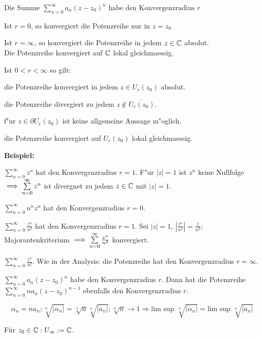 \documentclass[a4paper,twoside,DIV15,BCOR12mm]{scrbook}
\begin{document}
\begin{satz}
Die Summe $  \sum\limits_{n=0}^\infty a_n(z-z_0)^n \text{ habe den Konvergenzradius } r$\\
\begin{liste}
 \item Ist $r=0$, so konvergiert die Potenzreihe nur in $z=z_0$
 \item Ist $r=\infty$, so konvergiert die Potenzreihe in jedem $z\in\mathbb{C}$ absolut. \\
  Die Potenzreihe konvergiert auf $\mathbb{C}$ lokal gleichmaessig.
 \item Ist $0<r<\infty$ so gilt: 
  \begin{liste}
   \item die Potenzreihe konvergiert in jedem $z\in U_r(z_0)$ absolut.
   \item die Potenzreihe divergiert zu jedem $z \not\in \overline{U_r(z_0)}$.
   \item f"ur $z\in \partial U_r(z_0)$ ist keine allgemeine Aussage m"oglich.
   \item die Potenzreihe konvergiert auf $U_r(z_0)$ lokal gleichmaessig.
  \end{liste}
\end{liste}
\end{satz}
\textbf{Beispiel:}\\
 \begin{liste}
  \item $ \sum\limits_{n=0}^\infty z^n $ hat den Konvergenzradius $r=1$. F"ur $|z|=1$ ist $z^n$ keine Nullfolge $ \implies \sum\limits_{n=0}^\infty z^n $ ist divergnet zu jedem $z\in\mathbb{C}$ mit $|z|=1$.
  \item $ \sum\limits_{n=0}^\infty n^n z^n $ hat den Konvergenzradius $r=0$.
  \item $ \sum\limits_{n=0}^\infty \frac{z^n}{n^2}$ hat den Konvergenzradius $r=1$. Sei $|z|=1$, $|\frac{z^n}{n^2}|=\frac{1}{n^2}$; Majorantenkriterium $\implies \sum\limits_{n=0}^\infty \frac{z^n}{n^2}$ konvergiert.
  \item $ \sum\limits_{n=0}^\infty \frac{z^n}{n!}$. Wie in der Analysis: die Potenzreihe hat den Konvergenzradius $r=\infty$.
 \end{liste}

\begin{satz}
$\sum\limits_{n=0}^{\infty} a_n(z-z_0)^n$ habe den Konvergenzradius $r$. 
Dann hat die Potenzreihe $\sum\limits_{n=0}^{\infty} na_n(z-z_0)^{n-1}$ ebenfalls den Konvergenzradius $r$.
\end{satz}
\begin{beweis}
\[\alpha_n = n a_n; \sqrt[n]{|\alpha_n|} = \sqrt[n]{n}\sqrt[n]{|a_n|}; \sqrt[n]{n} \to 1 
\Rightarrow \text{lim sup } \sqrt[n]{|\alpha_n|} = \text{lim sup } \sqrt[n]{|a_n|} \]
\end{beweis}
\begin{definition}
Für $z_0 \in \mathbb{C}: U_{\infty} := \mathbb{C}$.
\end{definition}
\end{document}
